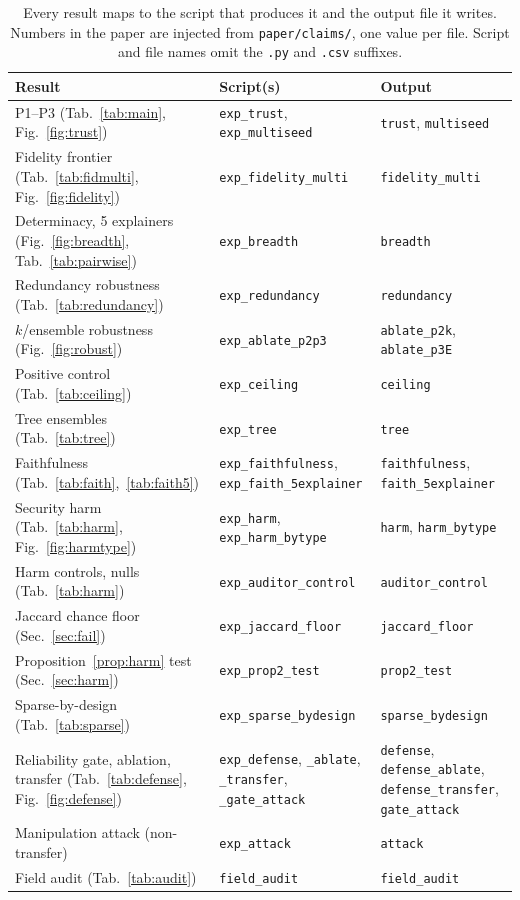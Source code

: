 \documentclass[conference]{IEEEtran}
\begin{document}
\begin{table}[t]
\centering
\caption{Every result maps to the script that produces it and the output file it writes. Numbers in
the paper are injected from \texttt{paper/claims/}, one value per file. Script and file names omit the
\texttt{.py} and \texttt{.csv} suffixes.}
\label{tab:repro}
\small\setlength{\tabcolsep}{6pt}
\begin{tabular}{@{}p{4.6cm}p{6.2cm}p{6.2cm}@{}}
\toprule
Result & Script(s) & Output \\
\midrule
P1--P3 (Tab.~\ref{tab:main}, Fig.~\ref{fig:trust}) & \texttt{exp\_trust}, \texttt{exp\_multiseed} & \texttt{trust}, \texttt{multiseed} \\
Fidelity frontier (Tab.~\ref{tab:fidmulti}, Fig.~\ref{fig:fidelity}) & \texttt{exp\_fidelity\_multi} & \texttt{fidelity\_multi} \\
Determinacy, 5 explainers (Fig.~\ref{fig:breadth}, Tab.~\ref{tab:pairwise}) & \texttt{exp\_breadth} & \texttt{breadth} \\
Redundancy robustness (Tab.~\ref{tab:redundancy}) & \texttt{exp\_redundancy} & \texttt{redundancy} \\
$k$/ensemble robustness (Fig.~\ref{fig:robust}) & \texttt{exp\_ablate\_p2p3} & \texttt{ablate\_p2k}, \texttt{ablate\_p3E} \\
Positive control (Tab.~\ref{tab:ceiling}) & \texttt{exp\_ceiling} & \texttt{ceiling} \\
Tree ensembles (Tab.~\ref{tab:tree}) & \texttt{exp\_tree} & \texttt{tree} \\
Faithfulness (Tab.~\ref{tab:faith},~\ref{tab:faith5}) & \texttt{exp\_faithfulness}, \texttt{exp\_faith\_5explainer} & \texttt{faithfulness}, \texttt{faith\_5explainer} \\
Security harm (Tab.~\ref{tab:harm}, Fig.~\ref{fig:harmtype}) & \texttt{exp\_harm}, \texttt{exp\_harm\_bytype} & \texttt{harm}, \texttt{harm\_bytype} \\
Harm controls, nulls (Tab.~\ref{tab:harm}) & \texttt{exp\_auditor\_control} & \texttt{auditor\_control} \\
Jaccard chance floor (Sec.~\ref{sec:fail}) & \texttt{exp\_jaccard\_floor} & \texttt{jaccard\_floor} \\
Proposition~\ref{prop:harm} test (Sec.~\ref{sec:harm}) & \texttt{exp\_prop2\_test} & \texttt{prop2\_test} \\
Sparse-by-design (Tab.~\ref{tab:sparse}) & \texttt{exp\_sparse\_bydesign} & \texttt{sparse\_bydesign} \\
Reliability gate, ablation, transfer (Tab.~\ref{tab:defense}, Fig.~\ref{fig:defense}) & \texttt{exp\_defense}, \texttt{\_ablate}, \texttt{\_transfer}, \texttt{\_gate\_attack} & \texttt{defense}, \texttt{defense\_ablate}, \texttt{defense\_transfer}, \texttt{gate\_attack} \\
Manipulation attack (non-transfer) & \texttt{exp\_attack} & \texttt{attack} \\
Field audit (Tab.~\ref{tab:audit}) & \texttt{field\_audit} & \texttt{field\_audit} \\
\bottomrule
\end{tabular}
\end{table}
\end{document}
